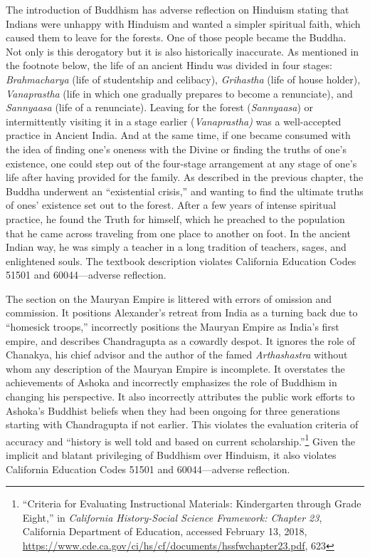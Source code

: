 The introduction of Buddhism has adverse reflection on Hinduism stating that Indians were unhappy with Hinduism and wanted a simpler spiritual faith, which caused them to leave for the forests. One of those people became the Buddha. Not only is this derogatory but it is also historically inaccurate. As mentioned in the footnote below, the life of an ancient Hindu was divided in four stages: \textit{Brahmacharya}  (life of studentship and celibacy), \textit{Grihastha}  (life of house holder), \textit{Vanaprastha}  (life in which one gradually prepares to become a renunciate), and \textit{Sannyaasa}  (life of a renunciate). Leaving for the forest (\textit{Sannyaasa}) or intermittently visiting it in a stage earlier (\textit{Vanaprastha)}  was a well-accepted practice in Ancient India. And at the same time, if one became consumed with the idea of finding one’s oneness with the Divine or finding the truths of one’s existence, one could step out of the four-stage arrangement at any stage of one’s life after having provided for the family. As described in the previous chapter, the Buddha underwent an “existential crisis,” and wanting to find the ultimate truths of ones’ existence set out to the forest. After a few years of intense spiritual practice, he found the Truth for himself, which he preached to the population that he came across traveling from one place to another on foot. In the ancient Indian way, he was simply a teacher in a long tradition of teachers, sages, and enlightened souls. The textbook description violates California Education Codes 51501 and 60044—adverse reflection.  

The section on the Mauryan Empire is littered with errors of omission and commission. It positions Alexander’s retreat from India as a turning back due to “homesick troops,” incorrectly positions the Mauryan Empire as India’s first empire, and describes Chandragupta as a cowardly despot. It ignores the role of Chanakya, his chief advisor and the author of the famed \textit{Arthashastra}  without whom any description of the Mauryan Empire is incomplete. It overstates the achievements of Ashoka and incorrectly emphasizes the role of Buddhism in changing his perspective. It also incorrectly attributes the public work efforts to Ashoka’s Buddhist beliefs when they had been ongoing for three generations starting with Chandragupta if not earlier. This violates the evaluation criteria of accuracy and “history is well told and based on current scholarship.”\footnote{“Criteria for Evaluating Instructional Materials: Kindergarten through Grade Eight,” in \textit{California History-Social Science Framework: Chapter 23}, California Department of Education, accessed February 13, 2018, \url{https://www.cde.ca.gov/ci/hs/cf/documents/hssfwchapter23.pdf}, 623} Given the implicit and blatant privileging of Buddhism over Hinduism, it also violates California Education Codes 51501 and 60044—adverse reflection.  

